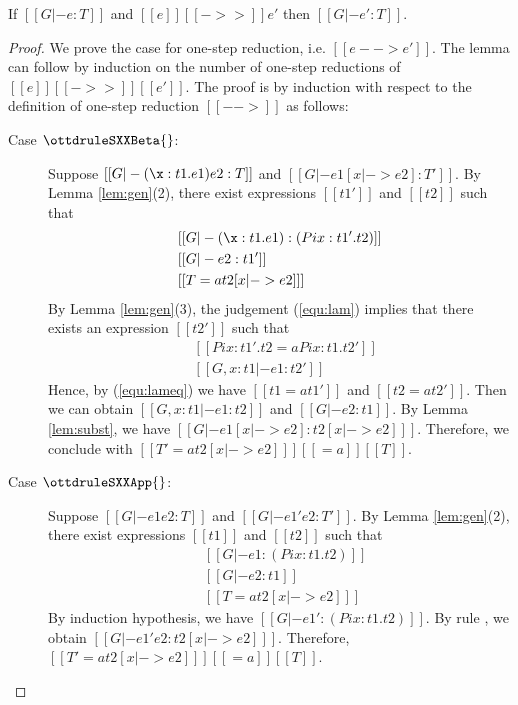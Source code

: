 \begin{lem}
If $[[G |- e:T]]$ and $[[e]] [[->>]] e'$ then $[[G |- e':T]]$.
\end{lem}

\begin{proof}
    We prove the case for one-step reduction, i.e. $[[e --> e']]$. The lemma can follow by induction on the number of one-step reductions of $[[e]] [[->>]] [[e']]$.
    The proof is by induction with respect to the definition of one-step reduction $[[-->]]$ as follows:
    \begin{description}
        \item[Case $\ottdruleSXXBeta{}$:] $\quad$ \\
        Suppose $[[G |- (\x:t1.e1)e2 :T]]$ and $[[G |- e1 [x |-> e2] :T']]$. By Lemma \ref{lem:gen}(2), there exist expressions $[[t1']]$ and $[[t2]]$ such that 
        \begin{align}
            &[[G |- (\x:t1.e1):(Pi x:t1'.t2)]] \label{equ:lam} \\
            &[[G |- e2:t1']] \nonumber \\
            &[[T =a t2 [x |-> e2] ]] \nonumber
        \end{align}
        By Lemma \ref{lem:gen}(3), the judgement (\ref{equ:lam}) implies that there exists an expression $[[t2']]$ such that
        \begin{align}
            &[[Pi x:t1'.t2 =a Pi x:t1.t2']] \label{equ:lameq}\\
            &[[G, x:t1 |- e1:t2']] \nonumber
        \end{align}
        Hence, by (\ref{equ:lameq}) we have $[[t1 =a t1']]$ and $[[t2 =a t2']]$. Then we can obtain $[[G, x:t1 |- e1:t2]]$ and $[[G |- e2:t1]]$. By Lemma \ref{lem:subst}, we have $[[G |- e1[x |-> e2] : t2[x |-> e2] ]]$. Therefore, we conclude with $[[T' =a t2[x |-> e2] ]] [[=a]] [[T]]$.
        
        \item[Case $\ottdruleSXXApp{}$:] $\quad$ \\
        Suppose $[[G |- e1 e2 :T]]$ and $[[G |- e1' e2 :T']]$. By Lemma \ref{lem:gen}(2), there exist expressions $[[t1]]$ and $[[t2]]$ such that 
        \begin{align*}
            &[[G |- e1:(Pi x:t1.t2)]] \\
            &[[G |- e2:t1]]\\
            &[[T =a t2 [x |-> e2] ]]
        \end{align*}
        By induction hypothesis, we have $[[G |- e1':(Pi x:t1.t2)]]$. By rule , we obtain $[[G |- e1' e2 : t2[x |-> e2] ]]$. Therefore, $[[T' =a t2[x |-> e2] ]] [[=a]] [[T]]$.
        

\end{description}
\end{proof}
